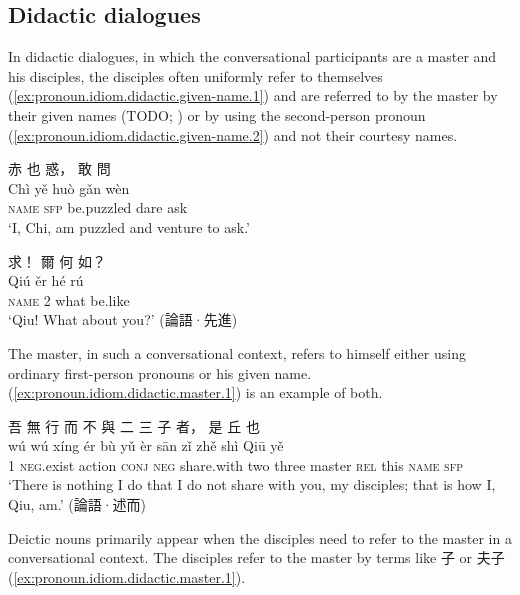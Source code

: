 \documentclass[UTF8, a4paper, oneside, scheme=plain, 12pt]{ctexrep}
\newcommand{\translate}[1]{`#1'}
\newcommand*{\category}[1]{\textsc{#1}}
\begin{document}
\subsection{Didactic dialogues}

In didactic dialogues, in which the conversational participants are a master and his disciples, the disciples often uniformly refer to themselves (\ref{ex:pronoun.idiom.didactic.given-name.1}) and are referred to by the master by their given names (TODO; ) or by using the second-person pronoun (\ref{ex:pronoun.idiom.didactic.given-name.2}) and not their courtesy names.

\begin{exe}
    \ex\label{ex:pronoun.idiom.didactic.given-name.1}
    \glll 赤 也 惑， 敢 問 \\
    Chì yě huò gǎn wèn \\
    \category{name} \category{sfp} be.puzzled dare ask \\
    \glt\translate{I, Chi, am puzzled and venture to ask.}

    \ex\label{ex:pronoun.idiom.didactic.given-name.2}
    \glll 求！ 爾 何 如？ \\
    Qiú ěr hé rú \\
    \category{name} 2 what be.like \\
    \glt\translate{Qiu! What about you?} \hfill (論語·先進)
\end{exe}

The master, in such a conversational context, 
refers to himself either using ordinary first-person pronouns or his given name.
(\ref{ex:pronoun.idiom.didactic.master.1}) is an example of both.

\begin{exe}
    \ex\label{ex:pronoun.idiom.didactic.master.1}
    \glll 吾 無 行 而 不 與 二 三 子 者， 是 丘 也 \\
    wú wú xíng ér bù yǔ èr sān zǐ zhě shì Qiū yě \\
    1 \category{neg}.exist action \category{conj} \category{neg} share.with two three master \category{rel} this \category{name} \category{sfp} \\
    \glt\translate{There is nothing I do that I do not share with you, my disciples; that is how I, Qiu, am.} \hfill (論語·述而)
\end{exe}

Deictic nouns primarily appear when the disciples need to refer to the master in a conversational context.
The disciples refer to the master by terms like 子 or 夫子 (\ref{ex:pronoun.idiom.didactic.master.1}).
\end{document}

